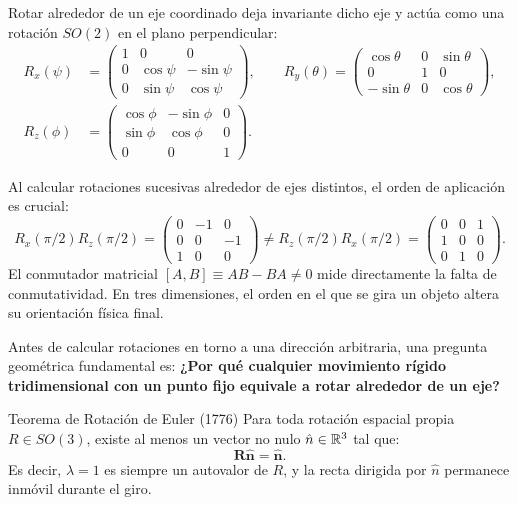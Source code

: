 \documentclass[11pt,letterpaper]{article}
\begin{document}
Rotar alrededor de un eje coordinado deja invariante dicho eje y actúa como una rotación $SO(2)$ en el plano perpendicular:
\begin{align*}
R_x(\psi) &= \begin{pmatrix} 1 & 0 & 0 \\ 0 & \cos\psi & -\sin\psi \\ 0 & \sin\psi & \cos\psi \end{pmatrix}, \qquad
R_y(\theta) = \begin{pmatrix} \cos\theta & 0 & \sin\theta \\ 0 & 1 & 0 \\ -\sin\theta & 0 & \cos\theta \end{pmatrix}, \\
R_z(\phi) &= \begin{pmatrix} \cos\phi & -\sin\phi & 0 \\ \sin\phi & \cos\phi & 0 \\ 0 & 0 & 1 \end{pmatrix}.
\end{align*}

Al calcular rotaciones sucesivas alrededor de ejes distintos, el orden de aplicación es crucial:
\[
R_x(\pi/2) R_z(\pi/2) = \begin{pmatrix} 0 & -1 & 0 \\ 0 & 0 & -1 \\ 1 & 0 & 0 \end{pmatrix} \neq
R_z(\pi/2) R_x(\pi/2) = \begin{pmatrix} 0 & 0 & 1 \\ 1 & 0 & 0 \\ 0 & 1 & 0 \end{pmatrix}.
\]
El conmutador matricial $[A, B] \equiv AB - BA \neq 0$ mide directamente la falta de conmutatividad. En tres dimensiones, el orden en el que se gira un objeto altera su orientación física final.

Antes de calcular rotaciones en torno a una dirección arbitraria, una pregunta geométrica fundamental es: \textbf{¿Por qué cualquier movimiento rígido tridimensional con un punto fijo equivale a rotar alrededor de un eje?}

\begin{theorembox}{Teorema de Rotación de Euler (1776)}
Para toda rotación espacial propia $R \in SO(3)$, existe al menos un vector no nulo $\hat{n} \in \mathbb{R}^3$ tal que:
\[
\mathbf{R\hat{n} = \hat{n}}.
\]
Es decir, $\lambda = 1$ es siempre un autovalor de $R$, y la recta dirigida por $\hat{n}$ permanece inmóvil durante el giro.
\end{theorembox}
\end{document}
